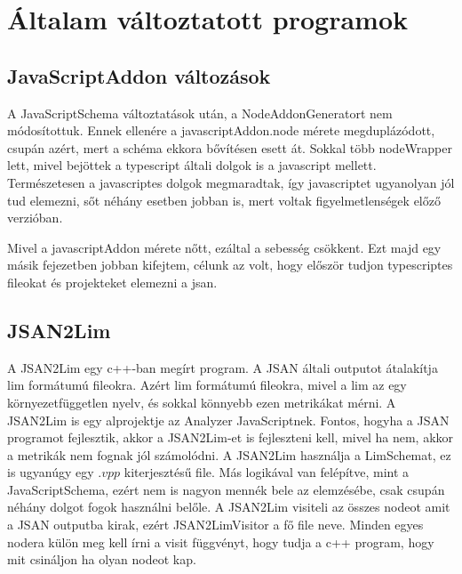\chapter{Általam változtatott programok}\label{chap:altalam_valtoztatott_programok}

\section{JavaScriptAddon változások}

\noindent

A JavaScriptSchema változtatások után, a NodeAddonGeneratort nem módosítottuk.
Ennek ellenére a javascriptAddon.node mérete megduplázódott, csupán azért, mert a schéma ekkora bővítésen esett át.
Sokkal több nodeWrapper lett, mivel bejöttek a typescript általi dolgok is a javascript mellett.
Természetesen a javascriptes dolgok megmaradtak, így javascriptet ugyanolyan jól tud elemezni, sőt néhány esetben jobban is, mert voltak figyelmetlenségek előző verzióban.

\noindent

Mivel a javascriptAddon mérete nőtt, ezáltal a sebesség csökkent.
Ezt majd egy másik fejezetben jobban kifejtem, célunk az volt, hogy először tudjon typescriptes fileokat és projekteket elemezni a jsan.


\section{JSAN2Lim}

\noindent

A JSAN2Lim egy c++-ban megírt program. A JSAN általi outputot átalakítja lim formátumú fileokra.
Azért lim formátumú fileokra, mivel a lim az egy környezetfüggetlen nyelv, és sokkal könnyebb ezen metrikákat mérni.
A JSAN2Lim is egy alprojektje az Analyzer JavaScriptnek.
Fontos, hogyha a JSAN programot fejlesztik, akkor a JSAN2Lim-et is fejleszteni kell, mivel ha nem, akkor a metrikák nem fognak jól számolódni.
A JSAN2Lim használja a LimSchemat, ez is ugyanúgy egy $.vpp$ kiterjesztésű file.
Más logikával van felépítve, mint a JavaScriptSchema, ezért nem is nagyon mennék bele az elemzésébe, csak csupán néhány dolgot fogok használni belőle.
A JSAN2Lim visiteli az összes nodeot amit a JSAN outputba kirak, ezért JSAN2LimVisitor a fő file neve.
Minden egyes nodera külön meg kell írni a visit függvényt, hogy tudja a c++ program, hogy mit csináljon ha olyan nodeot kap.

\noindent

